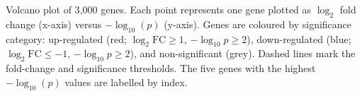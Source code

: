 \caption{Volcano plot of 3{,}000 genes. Each point represents one gene plotted as $\log_2$ fold change (x-axis) versus $-\log_{10}(p)$ (y-axis). Genes are coloured by significance category: up-regulated (red; $\log_2\text{FC} \geq 1$, $-\log_{10}p \geq 2$), down-regulated (blue; $\log_2\text{FC} \leq -1$, $-\log_{10}p \geq 2$), and non-significant (grey). Dashed lines mark the fold-change and significance thresholds. The five genes with the highest $-\log_{10}(p)$ values are labelled by index.}
